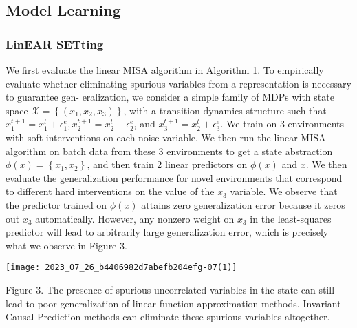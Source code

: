 \documentclass[10pt]{article}
\begin{document}
\subsection{Model Learning}
\subsubsection{LinEAR SETting}
We first evaluate the linear MISA algorithm in Algorithm 1. To empirically evaluate whether eliminating spurious variables from a representation is necessary to guarantee gen- eralization, we consider a simple family of MDPs with state space $\mathcal{X}=\left\{\left(x_{1}, x_{2}, x_{3}\right)\right\}$, with a transition dynamics structure such that $x_{1}^{t+1}=x_{1}^{t}+\epsilon_{1}^{e}, x_{2}^{t+1}=x_{2}^{t}+\epsilon_{2}^{e}$, and $x_{3}^{t+1}=x_{2}^{t}+\epsilon_{3}^{e}$. We train on 3 environments with soft interventions on each noise variable. We then run the linear MISA algorithm on batch data from these 3 environments to get a state abstraction $\phi(x)=\left\{x_{1}, x_{2}\right\}$, and then train 2 linear predictors on $\phi(x)$ and $x$. We then evaluate the generalization performance for novel environments that correspond to different hard interventions on the value of the $x_{3}$ variable. We observe that the predictor trained on $\phi(x)$ attains zero generalization error because it zeros out $x_{3}$ automatically. However, any nonzero weight on $x_{3}$ in the least-squares predictor will lead to arbitrarily large generalization error, which is precisely what we observe in Figure 3.

\begin{center}
\texttt{[image: 2023\_07\_26\_b4406982d7abefb204efg-07(1)]}
\end{center}

Figure 3. The presence of spurious uncorrelated variables in the state can still lead to poor generalization of linear function approximation methods. Invariant Causal Prediction methods can eliminate these spurious variables altogether.
\end{document}
